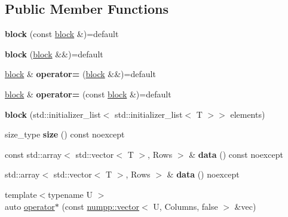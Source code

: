 \subsection*{Public Member Functions}
\begin{DoxyCompactItemize}
\item 
\mbox{\label{classnumpp_1_1matrix_1_1sparse_1_1block_a83470439e34e65f8abc0d59c81bf09c4}} 
{\bfseries block} (const \hyperlink{classnumpp_1_1matrix_1_1sparse_1_1block}{block} \&)=default
\item 
\mbox{\label{classnumpp_1_1matrix_1_1sparse_1_1block_a48e8a9c7c0610bb7e8b84b67db6e5a6c}} 
{\bfseries block} (\hyperlink{classnumpp_1_1matrix_1_1sparse_1_1block}{block} \&\&)=default
\item 
\mbox{\label{classnumpp_1_1matrix_1_1sparse_1_1block_aecf67898fb5cd432a940c4cb22b6790b}} 
\hyperlink{classnumpp_1_1matrix_1_1sparse_1_1block}{block} \& {\bfseries operator=} (\hyperlink{classnumpp_1_1matrix_1_1sparse_1_1block}{block} \&\&)=default
\item 
\mbox{\label{classnumpp_1_1matrix_1_1sparse_1_1block_a8ba9f28a47fd22af6fc63d6ba2a467ce}} 
\hyperlink{classnumpp_1_1matrix_1_1sparse_1_1block}{block} \& {\bfseries operator=} (const \hyperlink{classnumpp_1_1matrix_1_1sparse_1_1block}{block} \&)=default
\item 
\mbox{\label{classnumpp_1_1matrix_1_1sparse_1_1block_ab613bba3b224199917249af76563a7c3}} 
{\bfseries block} (std\+::initializer\+\_\+list$<$ std\+::initializer\+\_\+list$<$ T $>$$>$ elements)
\item 
\mbox{\label{classnumpp_1_1matrix_1_1sparse_1_1block_a0cafdc2b3674aa15cfe3575ed8d797c4}} 
size\+\_\+type {\bfseries size} () const noexcept
\item 
\mbox{\label{classnumpp_1_1matrix_1_1sparse_1_1block_a36977c382b70c3865ab252138d4617f4}} 
const std\+::array$<$ std\+::vector$<$ T $>$, Rows $>$ \& {\bfseries data} () const noexcept
\item 
\mbox{\label{classnumpp_1_1matrix_1_1sparse_1_1block_acd407b6661d5051136ec040a009651d8}} 
std\+::array$<$ std\+::vector$<$ T $>$, Rows $>$ \& {\bfseries data} () noexcept
\item 
{\footnotesize template$<$typename U $>$ }\\auto \hyperlink{classnumpp_1_1matrix_1_1sparse_1_1block_a9ee2ec26bf97fe00dfc11957de26156c}{operator$\ast$} (const \hyperlink{classnumpp_1_1vector}{numpp\+::vector}$<$ U, Columns, false $>$ \&vec)
\end{DoxyCompactItemize}


